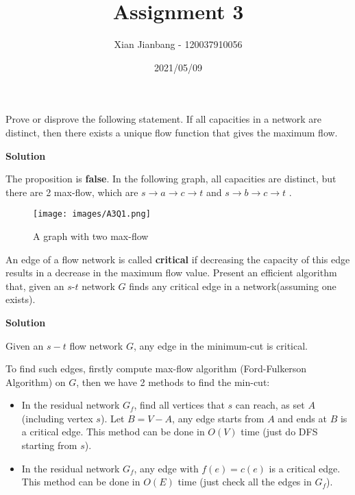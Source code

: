 \documentclass{article}
\title{{\bf Assignment 3}}
\author{Xian Jianbang - 120037910056}
\date{2021/05/09}
\newcounter{exercise}
\newcommand{\<}{
    \langle}
\renewcommand{\>}{
    \rangle}
\begin{document}
\maketitle


{\large





\begin{exercise}
Prove or disprove the following statement. If all capacities in a network are distinct,
 then there exists a unique flow function that gives the maximum flow.
\end{exercise}

\bigskip \noindent
\textbf{Solution}

The proposition is \textbf{false}. In the following graph, all capacities are distinct, but there are 2 max-flow, which are $s \rightarrow a \rightarrow c \rightarrow t$ and $s \rightarrow b \rightarrow c \rightarrow t$ .

\begin{figure}[htp]
    \centering
    \texttt{[image: images/A3Q1.png]}
    \caption{A graph with two max-flow}
\end{figure}


\begin{exercise}
An edge of a flow network is called \textbf{critical} if decreasing the capacity of this edge results in a decrease in the maximum flow value. Present an efficient algorithm that, given an $s$-$t$ network $G$ finds any critical edge in a network(assuming one exists).
\end{exercise}

\bigskip \noindent
\textbf{Solution}

Given an $s-t$ flow network $G$, any edge in the minimum-cut is critical. 

To find such edges, firstly compute max-flow algorithm (Ford-Fulkerson Algorithm) on $G$, then we have 2 methods to find the min-cut:

\begin{itemize}
    \item In the residual network $G_f$, find all vertices that $s$ can reach, as set $A$ (including vertex $s$). Let $B = V-A$, any edge starts from $A$ and ends at $B$ is a critical edge. This method can be done in $O(V)$ time (just do DFS starting from $s$).
    \item In the residual network $G_f$, any edge with $f(e) = c(e)$ is a critical edge. This method can be done in $O(E)$ time (just check all the edges in $G_f$).
\end{itemize}

}
\end{document}
